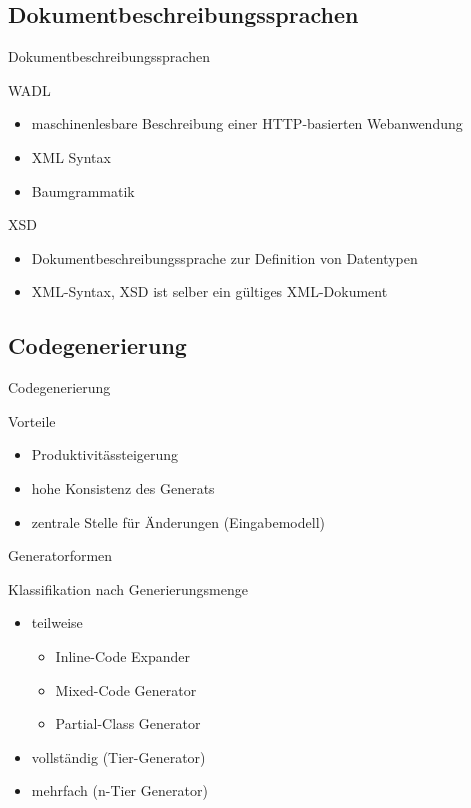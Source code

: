 \subsection{Dokumentbeschreibungssprachen}
\begin{frame}[squeeze]{Dokumentbeschreibungssprachen}
    \begin{block}{WADL}
        \begin{itemize}
            \item maschinenlesbare Beschreibung einer HTTP-basierten Webanwendung
            \item XML Syntax
            \item Baumgrammatik
        \end{itemize}
    \end{block}
    \begin{block}{XSD}
        \begin{itemize}
            \item Dokumentbeschreibungssprache zur Definition von Datentypen
            \item XML-Syntax, XSD ist selber ein gültiges XML-Dokument
        \end{itemize}
    \end{block}
\end{frame}

\subsection{Codegenerierung}
\begin{frame}{Codegenerierung}

    \begin{block}{Vorteile}
        \begin{itemize}
            \item Produktivitässteigerung
            \item hohe Konsistenz des Generats
            \item zentrale Stelle für Änderungen (Eingabemodell)
        \end{itemize}
    \end{block}
\end{frame}

\begin{frame}{Generatorformen}
    \begin{block}{Klassifikation nach Generierungsmenge}
        \begin{itemize}
            \item teilweise
            \begin{itemize}
                \item Inline-Code Expander
                \item Mixed-Code Generator
                \item Partial-Class Generator
            \end{itemize}
            \item vollständig (Tier-Generator)
            \item mehrfach (n-Tier Generator)
        \end{itemize}
    \end{block}
\end{frame}

